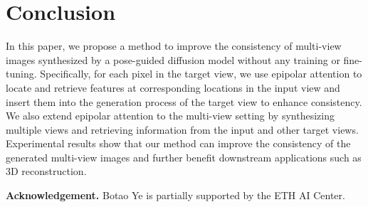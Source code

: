 \vspace{-2mm}
\section{Conclusion}
\vspace{-2mm}
\label{sec:conclusion}


In this paper, we propose a method to improve the consistency of multi-view images synthesized by a pose-guided diffusion model without any training or fine-tuning.
Specifically, for each pixel in the target view, we use epipolar attention to locate and retrieve features at corresponding locations in the input view and insert them into the generation process of the target view to enhance consistency. We also extend epipolar attention to the multi-view setting by synthesizing multiple views and retrieving information from the input and other target views.
Experimental results show that our method can improve the consistency of the generated multi-view images and further benefit downstream applications such as 3D reconstruction.

\textbf{Acknowledgement.} Botao Ye is partially supported by the ETH AI Center.
